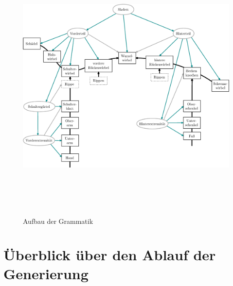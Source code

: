  \begin{figure}
  \centering
  \includegraphics[height=14cm]{graphics/grammarGraph}
  \caption{Aufbau der Grammatik}
  \label{grammar_graph}
 \end{figure}




\section{Überblick über den Ablauf der Generierung}

\\

